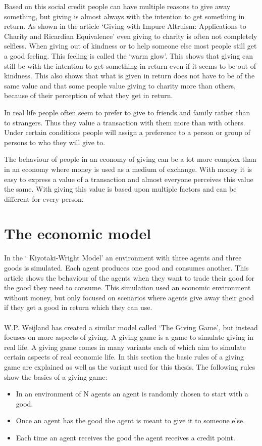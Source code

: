 \documentclass[twoside,openright]{uva-bachelor-thesis}
\begin{document}
Based on this social credit people can have multiple reasons to give away something, but giving is almost always with the intention to get something in return. As shown in the article ‘Giving with Impure Altruism: Applications to Charity and Ricardian Equivalence’ even giving to charity is often not completely selfless. When giving out of kindness or to help someone else most people still get a good feeling. This feeling is called the ‘warm glow’. This shows that giving can still be with the intention to get something in return even if it seems to be out of kindness. This also shows that what is given in return does not have to be of the same value and that some people value giving to charity more than others, because of their perception of what they get in return.

In real life people often seem to prefer to give to friends and family rather than to strangers. Thus they value a transaction with them more than with others. Under certain conditions people will assign a preference to a person or group of persons to who they will give to.

The behaviour of people in an economy of giving can be a lot more complex than in an economy where money is used as a medium of exchange. With money it is easy to express a value of a transaction and almost everyone perceives this value the same. With giving this value is based upon multiple factors and can be different for every person.



\section{The economic model}
In the ‘ Kiyotaki-Wright Model’ an environment with three agents and three goods is simulated. Each agent produces one good and consumes another. This article shows the behaviour of the agents when they want to trade their good for the good they need to consume. This simulation used an economic environment without money, but only focused on scenarios where agents give away their good if they get a good in return which they can use. 
\\
\\
W.P. Weijland has created a similar model called ‘The Giving Game’, but instead focuses on more aspects of giving. A giving game is a game to simulate giving in real life. A giving game comes in many variants each of which aim to simulate certain aspects of real economic life. In this section the basic rules of a giving game are explained as well as the variant used for this thesis.
The following rules show the basics of a giving game:
\begin{itemize}
  \item In an environment of N agents an agent is randomly chosen to start with a good.
  \item Once an agent has the good the agent is meant to give it to someone else.
  \item Each time an agent receives the good the agent receives a credit point.
\end{itemize}
\end{document}

